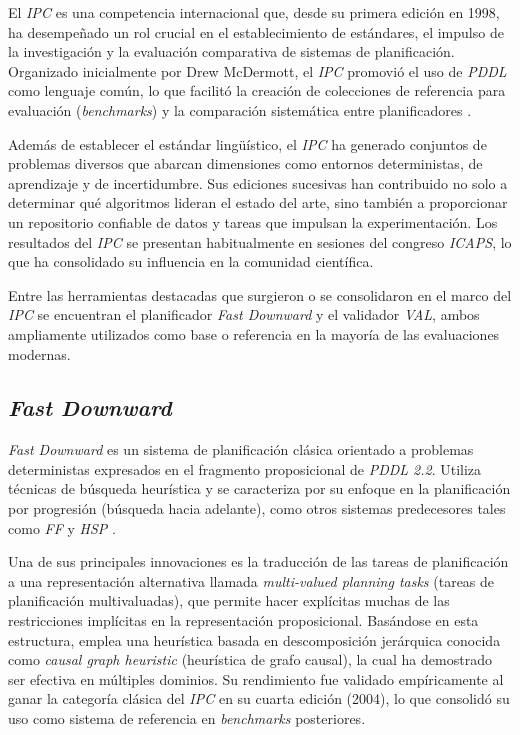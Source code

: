 El \textit{IPC} es una competencia internacional que, desde su primera edición en 1998, ha desempeñado un rol crucial en el establecimiento de estándares, el impulso de la investigación y la evaluación comparativa de sistemas de planificación. Organizado inicialmente por Drew McDermott, el \textit{IPC} promovió el uso de \textit{PDDL} como lenguaje común, lo que facilitó la creación de colecciones de referencia para evaluación (\textit{benchmarks}) y la comparación sistemática entre planificadores \parencite{coles2012survey}.

Además de establecer el estándar lingüístico, el \textit{IPC} ha generado conjuntos de problemas diversos que abarcan dimensiones como entornos deterministas, de aprendizaje y de incertidumbre. Sus ediciones sucesivas han contribuido no solo a determinar qué algoritmos lideran el estado del arte, sino también a proporcionar un repositorio confiable de datos y tareas que impulsan la experimentación. Los resultados del \textit{IPC} se presentan habitualmente en sesiones del congreso \textit{ICAPS}, lo que ha consolidado su influencia en la comunidad científica.

Entre las herramientas destacadas que surgieron o se consolidaron en el marco del \textit{IPC} se encuentran el planificador \textit{Fast Downward} y el validador \textit{VAL}, ambos ampliamente utilizados como base o referencia en la mayoría de las evaluaciones modernas.

\subsection{\textit{Fast Downward}}

\textit{Fast Downward} es un sistema de planificación clásica orientado a problemas deterministas expresados en el fragmento proposicional de \textit{PDDL 2.2}. Utiliza técnicas de búsqueda heurística y se caracteriza por su enfoque en la planificación por progresión (búsqueda hacia adelante), como otros sistemas predecesores tales como \textit{FF} y \textit{HSP} \parencite{helmert2006fast}.

Una de sus principales innovaciones es la traducción de las tareas de planificación a una representación alternativa llamada \textit{multi-valued planning tasks} (tareas de planificación multivaluadas), que permite hacer explícitas muchas de las restricciones implícitas en la representación proposicional. Basándose en esta estructura, emplea una heurística basada en descomposición jerárquica conocida como \textit{causal graph heuristic} (heurística de grafo causal), la cual ha demostrado ser efectiva en múltiples dominios. Su rendimiento fue validado empíricamente al ganar la categoría clásica del \textit{IPC} en su cuarta edición (2004), lo que consolidó su uso como sistema de referencia en \textit{benchmarks} posteriores.

